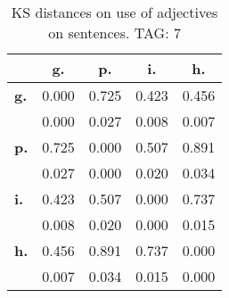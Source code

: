 \begin{table}[h!]
\begin{center}
\begin{tabular}{| l || c | c | c | c |}\hline
 & {\bf g.} & {\bf p.} & {\bf i.} & {\bf h.} \\\hline\hline
{\bf g.} & 0.000 & 0.725 & 0.423 & 0.456 \\
{\bf } & 0.000 & 0.027 & 0.008 & 0.007 \\\hline
{\bf p.} & 0.725 & 0.000 & 0.507 & 0.891 \\
{\bf } & 0.027 & 0.000 & 0.020 & 0.034 \\\hline
{\bf i.} & 0.423 & 0.507 & 0.000 & 0.737 \\
{\bf } & 0.008 & 0.020 & 0.000 & 0.015 \\\hline
{\bf h.} & 0.456 & 0.891 & 0.737 & 0.000 \\
{\bf } & 0.007 & 0.034 & 0.015 & 0.000 \\\hline
\end{tabular}
\caption{KS distances on use of adjectives on sentences. TAG: 7}
\end{center}
\end{table}